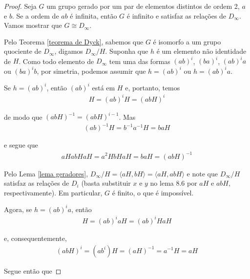 	\begin{proof}
		Seja $G$ um grupo gerado por um par de elementos distintos de ordem 2, $a$ e $b$. Se a ordem de $ab$ é infinita, então $G$ é infinito e satisfaz as relações de $D_{\infty}$. Vamos mostrar que $G\cong D_{\infty}$. 
		
		\par\vspace{0.3cm} Pelo Teorema \eqref{teorema de Dyck}, sabemos que $G$ é isomorfo a um grupo quociente de $D_{\infty}$, digamos $D_{\infty}/H$. Suponha que $h$ é um elemento não identidade de $H$. Como todo elemento de $D_{\infty}$ tem uma das formas $(ab)^i$, $(ba)^i$, $(ab)^ia$ ou $(ba)^ib$, por simetria, podemos assumir que $h = (ab)^i$ ou $h = (ab)^ia$.
		
		\par\vspace{0.3cm} Se $h = (ab)^i$, então $(ab)^i$ está em $H$ e, portanto, temos
		\begin{align*}
		H = (ab)^iH = (abH)^i
		\end{align*}
		\par\vspace{0.3cm} de modo que $(abH)^{-1} = (abH)^{i-1}$. Mas
		\begin{align*}
		(ab)^{-1}H = b^{-1}a^{-1}H = baH
		\end{align*}
		\par\vspace{0.3cm} e segue que
		\begin{align*}
		aHabHaH = a^2HbHaH = baH = (abH)^{-1}
		\end{align*}
		\par\vspace{0.3cm} Pelo Lema \eqref{lema geradores}, $D_{\infty}/H = \langle aH, bH \rangle = \langle aH, abH \rangle$ e note que $D_{\infty}/H$ satisfaz as relações de $D_i$ (basta substituir $x$ e $y$ no lema 8.6 por $aH$ e $abH$, respectivamente). Em particular, $G$ é finito, o que é impossível.
		\par\vspace{0.3cm} Agora, se $h = (ab)^ia$, então
		\begin{align*}
		H = (ab)^iaH = (ab)^iHaH
		\end{align*}
		\par\vspace{0.3cm} e, consequentemente, 
		\begin{align*}
		(abH)^i = (ab^i)H = (aH)^{-1} = a^{-1}H = aH
		\end{align*}
		\par\vspace{0.3cm} Segue então que

\end{proof}
